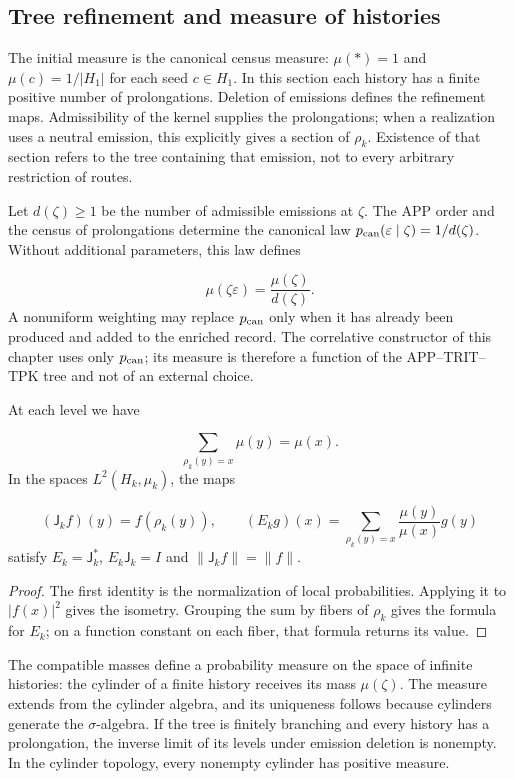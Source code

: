 \subsection{Tree refinement and measure of histories}
The initial measure is the canonical census measure: \(\mu(\ast)=1\) and \(\mu(c)=1/|H_1|\) for each seed \(c\in H_1\). In this section each history has a finite positive number of prolongations. Deletion of emissions defines the refinement maps. Admissibility of the kernel supplies the prolongations; when a realization uses a neutral emission, this explicitly gives a section of \(\rho_k\). Existence of that section refers to the tree containing that emission, not to every arbitrary restriction of routes.

Let \(d(\zeta)\geq1\) be the number of admissible emissions at \(\zeta\). The APP order and the census of prolongations determine the canonical law \(p_{\rm can}(\varepsilon\mid\zeta)=1/d(\zeta)\). Without additional parameters, this law defines

\[
\mu(\zeta\varepsilon)=\frac{\mu(\zeta)}{d(\zeta)}.
\]
A nonuniform weighting may replace \(p_{\rm can}\) only when it has already been produced and added to the enriched record. The correlative constructor of this chapter uses only \(p_{\rm can}\); its measure is therefore a function of the APP--TRIT--TPK tree and not of an external choice.

\begin{proposition}
\label{hmtfg:base:prop:continuo-esperanza-condicional}
At each level we have

\[
\sum_{\rho_k(y)=x}\mu(y)=\mu(x).
\]
In the spaces \(L^2(H_k,\mu_k)\), the maps

\[
(\mathsf J_kf)(y)=f(\rho_k(y)),
\qquad
(E_kg)(x)=\sum_{\rho_k(y)=x}\frac{\mu(y)}{\mu(x)}g(y)
\]
satisfy \(E_k=\mathsf J_k^*\), \(E_k\mathsf J_k=I\) and \(\|\mathsf J_kf\|=\|f\|\).
\end{proposition}
\begin{proof}
The first identity is the normalization of local probabilities. Applying it to \(|f(x)|^2\) gives the isometry. Grouping the sum by fibers of \(\rho_k\) gives the formula for \(E_k\); on a function constant on each fiber, that formula returns its value.
\end{proof}

The compatible masses define a probability measure on the space of infinite histories: the cylinder of a finite history receives its mass \(\mu(\zeta)\). The measure extends from the cylinder algebra, and its uniqueness follows because cylinders generate the \(\sigma\)-algebra. If the tree is finitely branching and every history has a prolongation, the inverse limit of its levels under emission deletion is nonempty. In the cylinder topology, every nonempty cylinder has positive measure.

